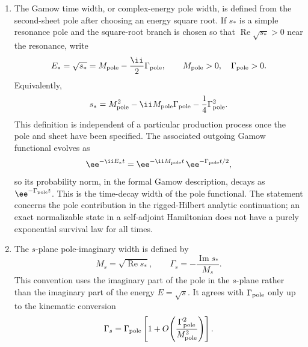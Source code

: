 \begin{definition}
\begin{enumerate}
\item The Gamow time width, or complex-energy pole width, is defined from the
second-sheet pole after choosing an energy square root.  If \(s_\ast\) is a
simple resonance pole and the square-root branch is chosen so that
\(\operatorname{Re}\sqrt{s_\ast}>0\) near the resonance, write
\[
  E_\ast=\sqrt{s_\ast}
  =
  M_{\rm pole}-\frac{\ii}{2}\Gamma_{\rm pole},
  \qquad M_{\rm pole}>0,\quad \Gamma_{\rm pole}>0.
\]
Equivalently,
\[
  s_\ast
  =
  M_{\rm pole}^2
  -\ii M_{\rm pole}\Gamma_{\rm pole}
  -\frac14\Gamma_{\rm pole}^2 .
\]
This definition is independent of a particular production process once the
pole and sheet have been specified.  The associated outgoing Gamow functional
evolves as
\[
  \ee^{-\ii E_\ast t}
  =
  \ee^{-\ii M_{\rm pole}t}\,
  \ee^{-\Gamma_{\rm pole}t/2},
\]
so its probability norm, in the formal Gamow description, decays as
\(\ee^{-\Gamma_{\rm pole}t}\).  This is the time-decay width of the pole
functional.  The statement concerns the pole contribution in the rigged-Hilbert
analytic continuation; an exact normalizable state in a self-adjoint
Hamiltonian does not have a purely exponential survival law for all times.

\item The \(s\)-plane pole-imaginary width is defined by
\[
  M_s=\sqrt{\operatorname{Re}s_\ast},
  \qquad
  \Gamma_s=-\frac{\operatorname{Im}s_\ast}{M_s}.
\]
This convention uses the imaginary part of the pole in the \(s\)-plane rather
than the imaginary part of the energy \(E=\sqrt{s}\).  It agrees with
\(\Gamma_{\rm pole}\) only up to the kinematic conversion
\[
  \Gamma_s
  =
  \Gamma_{\rm pole}
  \left[
    1+O\!\left(\frac{\Gamma_{\rm pole}^2}{M_{\rm pole}^2}\right)
  \right].
\]
\end{enumerate}
\end{definition}

